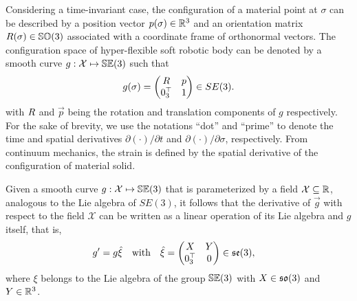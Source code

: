 Considering a time-invariant case, the configuration of a material point at $\sigma$ can be described by a position vector ${p}(\sigma) \in \mathbb{R}^3$ and an orientation matrix ${R}(\sigma) \in {\mathbb{SO}(3)}$ associated with a coordinate frame of orthonormal vectors. The configuration space of hyper-flexible soft robotic body can be denoted by a smooth curve $g:\mathcal{X} \mapsto {\mathbb{SE}(3)}$ such that
\begin{equation}
{g}(\sigma) = \begin{pmatrix} {R} & {p} \\ {0}_3^\top & 1 \end{pmatrix} \in SE(3). 
\end{equation}
with ${R}$ and $\vec{p}$ being the rotation and translation components of $g$ respectively. For the sake of brevity, we use the notations ``dot'' and ``prime'' to denote the time and spatial derivatives $\partial(\cdot)/\partial t$ and $\partial(\cdot)/\partial \sigma$, respectively. From continuum mechanics, the strain is defined by the spatial derivative of the configuration of material solid.

\begin{lemma}
\label{lemma:g_deriv}
Given a smooth curve $g: \mathcal{X} \mapsto {\mathbb{SE}(3)}$ that is parameterized by a field $\mathcal{X} \subseteq \mathbb{R}$, analogous to the Lie algebra of $SE(3)$, it follows that the derivative of $\vec{g}$ with respect to the field $\mathcal{X}$ can be written as a linear operation of its Lie algebra and $g$ itself, that is,
\begin{align}
{g}' & = {g}\hat{\xi} \quad \text{with} \quad \hat{\xi} = \begin{pmatrix} {X} & {Y} \\ {0}_3^\top & 0 \end{pmatrix} \in {\mathfrak{se}(3)},  \label{eq:gprime}
\end{align}
where $\xi$ belongs to the Lie algebra of the group ${\mathbb{SE}(3)}$ with ${X} \in {\mathfrak{so}(3)}$ and ${Y} \in \mathbb{R}^3$. 
\end{lemma}

